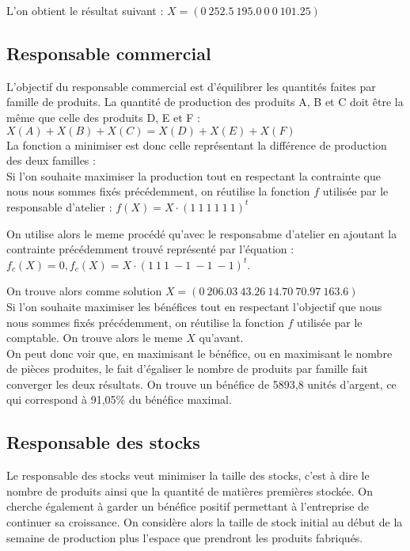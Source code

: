 \documentclass[a4paper, 11pt]{article}
\begin{document}
L'on obtient le résultat suivant : $ X = (0~252.5~195.0~0~0~101.25) $ \\

\subsection{Responsable commercial}
L'objectif du responsable commercial est d'équilibrer les quantités faites par famille de produits.
La quantité de production des produits A, B et C doit être la même que celle des produits D, E et F : \\
$X(A) + X(B) + X(C) = X(D) + X(E) + X(F)$ \\

La fonction a minimiser est donc celle représentant la différence de production des deux familles : \\
Si l’on souhaite maximiser la production tout en respectant la contrainte que nous
nous sommes fixés précédemment, on réutilise la fonction $f$ utilisée par le
responsable d’atelier : $ f(X) = X\cdot(1~1~1~1~1~1)^t $

On utilise alors le meme procédé qu'avec le responsabme d'atelier en ajoutant
la contrainte précédemment trouvé représenté par l'équation : \\
$ f_c(X) = 0, f_c(X) = X\cdot(1~1~1~-1~-1~-1)^t $.

On trouve alors comme solution $X = (0~206.03~43.26~14.70~70.97~163.6) $ \\

Si l’on souhaite maximiser les bénéfices tout en respectant l’objectif que nous
nous sommes fixés précédemment, on réutilise la fonction $f$ utilisée par le
comptable. On trouve alors le meme $X$ qu'avant. \\

On peut donc voir que, en maximisant le bénéfice, ou en maximisant le nombre de
pièces produites, le fait d’égaliser le nombre de produits par famille fait
converger les deux résultats. On trouve un bénéfice de 5893,8 unités d’argent,
ce qui correspond à 91,05\% du bénéfice maximal.


\subsection{Responsable des stocks}
Le responsable des stocks veut minimiser la taille des stocks, c'est à dire le
nombre de produits ainsi que la quantité de matières premières stockée. On
cherche également à garder un bénéfice positif permettant à l'entreprise de
continuer sa croissance. On considère alors la taille de stock initial au début
de la semaine de production plus l'espace que prendront les produits fabriqués.
\end{document}
